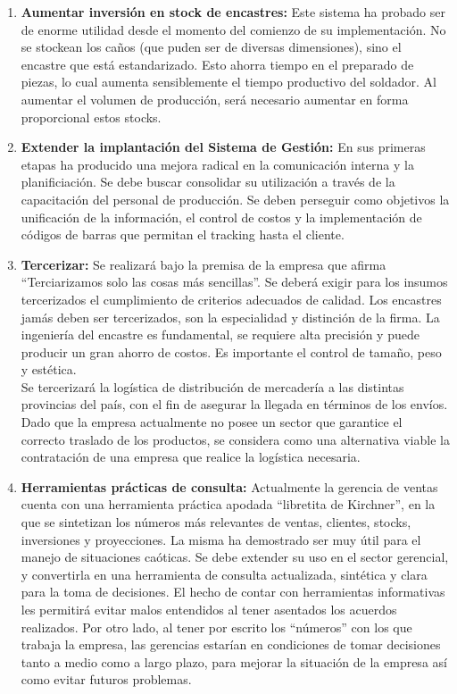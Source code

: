\documentclass[a4paper,10pt,titlepage]{article}
\begin{document}
\begin{enumerate}
\item \textbf{Aumentar inversi\'on en stock de encastres:} Este sistema ha probado ser de enorme utilidad desde el momento del comienzo de su implementaci\'on. No se stockean los ca\~nos (que puden ser de diversas dimensiones), sino el encastre que está estandarizado. Esto ahorra tiempo en el preparado de piezas, lo cual aumenta sensiblemente el tiempo productivo del soldador. Al aumentar el volumen de producci\'on, ser\'a necesario aumentar en forma proporcional estos stocks.

\item \textbf{Extender la implantaci\'on del Sistema de Gesti\'on:} En sus primeras etapas ha producido una mejora radical en la comunicaci\'on interna y la planificiaci\'on. Se debe buscar consolidar su utilizaci\'on a trav\'es de la capacitaci\'on del personal de producci\'on. Se deben perseguir como objetivos la unificaci\'on de la informaci\'on, el control de costos y la implementaci\'on de c\'odigos de barras que permitan el tracking hasta el cliente.

\item \textbf{Tercerizar:} Se realizar\'a bajo la premisa de la empresa que afirma ``Terciarizamos solo las cosas m\'as sencillas''. Se deber\'a exigir para los insumos tercerizados el cumplimiento de criterios adecuados de calidad. Los encastres jam\'as deben ser tercerizados, son la especialidad y distinci\'on de la firma. La ingenier\'ia del encastre es fundamental, se requiere alta precisi\'on y puede producir un gran ahorro de costos. Es importante el control de tama\~no, peso y est\'etica.\\
				Se tercerizar\'a la log\'istica de distribuci\'on de mercader\'ia a las distintas provincias del pa\'is, con el fin de asegurar la llegada en t\'erminos de los env\'ios. Dado que la empresa actualmente no posee un sector que garantice el correcto traslado de los productos, se considera como una alternativa viable la contrataci\'on de una empresa que realice la log\'istica necesaria.

\item \textbf{Herramientas pr\'acticas de consulta:} Actualmente la gerencia de ventas cuenta con una herramienta pr\'actica apodada ``libretita de Kirchner'', en la que se sintetizan los n\'umeros m\'as relevantes de ventas, clientes, stocks, inversiones y proyecciones. La misma ha demostrado ser muy \'util para el manejo de situaciones ca\'oticas. Se debe extender su uso en el sector gerencial, y convertirla en una herramienta de consulta actualizada, sint\'etica y clara para la toma de decisiones. El hecho de contar con herramientas informativas les permitir\'a evitar malos entendidos al tener asentados los acuerdos realizados. Por otro lado, al tener por escrito los ``n\'umeros'' con los que trabaja la empresa, las gerencias estar\'ian en condiciones de tomar decisiones tanto a medio como a largo plazo, para mejorar la situaci\'on de la empresa as\'i como evitar futuros problemas.


\end{enumerate}
\end{document}
